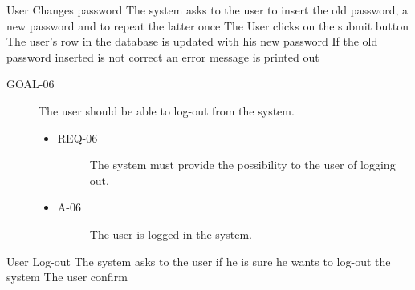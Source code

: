 \documentclass[a4paper]{article}
\newcommand{\requirement}{\ding{229}}%
\begin{document}
       \begin{usecase}{User Changes password}
              {The system asks to the user to insert the old password, a new password and to repeat the latter once}
              {The User clicks on the submit button}
              {The user's row in the database is updated with his new password}
        {If the old password inserted is not correct an error message is printed out}
       \end{usecase}
       
        \begin{description}
        	\item[GOAL-06] The user should be able to log-out from the system. 
            	\begin{itemize}
            	    \item[\requirement]
                	\begin{description}
                	\item[REQ-06] The system must provide the possibility to the user of logging out. 
                	\end{description}
                	\item
                	\begin{description}
                	\item[A-06] The user is logged in the system.
                	\end{description}
                	\end{itemize}
        \end{description}
              
       \begin{usecase}{User Log-out}
              {The system asks to the user if he is sure he wants to log-out the system}
              {The user confirm}
        \end{usecase}
       
\end{document}
